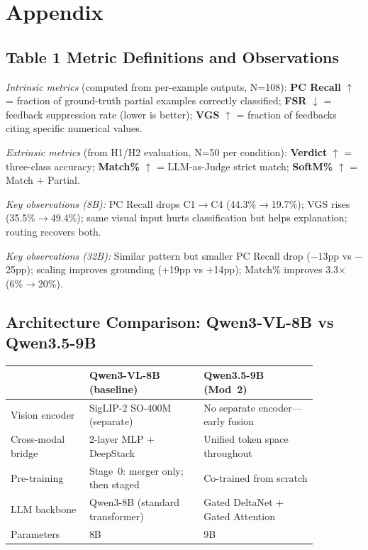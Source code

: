 \documentclass{article}
\begin{document}



\appendix
\section{Appendix}

\subsection{Table 1 Metric Definitions and Observations}
\label{app:table1}

\textit{Intrinsic metrics} (computed from per-example outputs, N=108):
\textbf{PC Recall} $\uparrow$ = fraction of ground-truth partial examples correctly classified;
\textbf{FSR} $\downarrow$ = feedback suppression rate (lower is better);
\textbf{VGS} $\uparrow$ = fraction of feedbacks citing specific numerical values.

\textit{Extrinsic metrics} (from H1/H2 evaluation, N=50 per condition):
\textbf{Verdict} $\uparrow$ = three-class accuracy;
\textbf{Match\%} $\uparrow$ = LLM-as-Judge strict match;
\textbf{SoftM\%} $\uparrow$ = Match + Partial.

\textit{Key observations (8B):} PC Recall drops C1$\to$C4 (44.3\%$\to$19.7\%); VGS rises (35.5\%$\to$49.4\%); same visual input hurts classification but helps explanation; routing recovers both.

\textit{Key observations (32B):} Similar pattern but smaller PC Recall drop ($-$13pp vs $-$25pp); scaling improves grounding (+19pp vs +14pp); Match\% improves 3.3$\times$ (6\%$\to$20\%).

\subsection{Architecture Comparison: Qwen3-VL-8B vs Qwen3.5-9B}
\label{app:arch}

\begin{center}
\small
\begin{tabular}{p{0.22\linewidth}p{0.32\linewidth}p{0.32\linewidth}}
\toprule
 & Qwen3-VL-8B (baseline) & Qwen3.5-9B (Mod~2) \\
\midrule
Vision encoder  & SigLIP-2 SO-400M (separate) & No separate encoder---early fusion \\
Cross-modal bridge & 2-layer MLP + DeepStack & Unified token space throughout \\
Pre-training    & Stage~0: merger only; then staged & Co-trained from scratch \\
LLM backbone    & Qwen3-8B (standard transformer) & Gated DeltaNet + Gated Attention \\
Parameters      & 8B & 9B \\
\bottomrule
\end{tabular}
\end{center}
\end{document}

